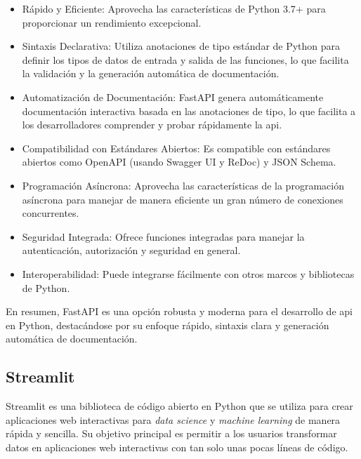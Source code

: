\begin{itemize}

\item Rápido y Eficiente: Aprovecha las características de Python 3.7+ para proporcionar un rendimiento excepcional.

\item Sintaxis Declarativa: Utiliza anotaciones de tipo estándar de Python para definir los tipos de datos de entrada y salida de las funciones, lo que facilita la validación y la generación automática de documentación.

\item Automatización de Documentación: FastAPI genera automáticamente documentación interactiva basada en las anotaciones de tipo, lo que facilita a los desarrolladores comprender y probar rápidamente la \acrshort{api}.

\item Compatibilidad con Estándares Abiertos: Es compatible con estándares abiertos como OpenAPI (usando Swagger UI y ReDoc) y JSON Schema.

\item Programación Asíncrona: Aprovecha las características de la programación asíncrona para manejar de manera eficiente un gran número de conexiones concurrentes.

\item Seguridad Integrada: Ofrece funciones integradas para manejar la autenticación, autorización y seguridad en general.

\item Interoperabilidad: Puede integrarse fácilmente con otros marcos y bibliotecas de Python.

\end{itemize}

En resumen, FastAPI es una opción robusta y moderna para el desarrollo de \acrshort{api} en Python, destacándose por su enfoque rápido, sintaxis clara y generación automática de documentación.

\subsection{Streamlit}

Streamlit es una biblioteca de código abierto en Python que se utiliza para crear aplicaciones web interactivas para \textit{data science} y \textit{machine learning} de manera rápida y sencilla. Su objetivo principal es permitir a los usuarios transformar datos en aplicaciones web interactivas con tan solo unas pocas líneas de código.


